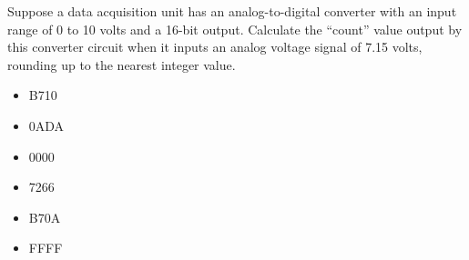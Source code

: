 Suppose a data acquisition unit has an analog-to-digital converter with an input range of 0 to 10 volts and a 16-bit output.  Calculate the ``count'' value output by this converter circuit when it inputs an analog voltage signal of 7.15 volts, rounding up to the nearest integer value. 

\begin{itemize}
\item{} B710
\vskip 5pt 
\item{} 0ADA
\vskip 5pt 
\item{} 0000
\vskip 5pt 
\item{} 7266
\vskip 5pt 
\item{} B70A
\vskip 5pt 
\item{} FFFF
\end{itemize}





